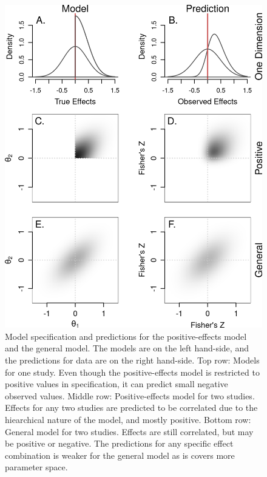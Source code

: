 \documentclass[english,,man]{apa6}
\begin{document}
\begin{figure}
\centering
\includegraphics{p_files/figure-latex/meta-modelcomp-1.png}
\caption{\label{fig:meta-modelcomp}Model specification and predictions for the positive-effects model and the general model. The models are on the left hand-side, and the predictions for data are on the right hand-side. Top row: Models for one study. Even though the positive-effects model is restricted to positive values in specification, it can predict small negative observed values. Middle row: Positive-effects model for two studies. Effects for any two studies are predicted to be correlated due to the hiearchical nature of the model, and mostly positive. Bottom row: General model for two studies. Effects are still correlated, but may be positive or negative. The predictions for any specific effect combination is weaker for the general model as is covers more parameter space.}
\end{figure}
\end{document}
